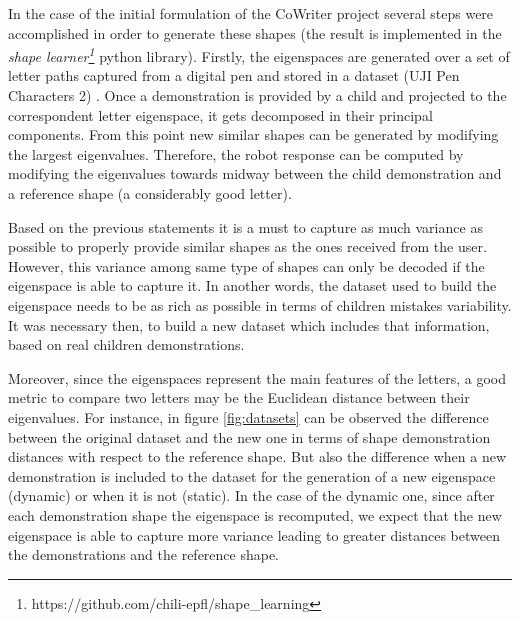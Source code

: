In the case of the initial formulation of the CoWriter project several steps were accomplished in order to generate these shapes (the result is implemented in the \textit{shape learner\footnote{https://github.com/chili-epfl/shape\_learning}} python library). Firstly, the eigenspaces are generated over a set of letter paths captured from a digital pen and stored in a dataset (UJI Pen Characters 2) \cite{ujidataset}. Once a demonstration is provided by a child and projected to the correspondent letter eigenspace, it gets decomposed in their principal components. From this point new similar shapes can be generated by modifying the largest eigenvalues. Therefore, the robot response can be computed by modifying the eigenvalues towards midway between the child demonstration and a reference shape (a considerably good letter).

Based on the previous statements it is a must to capture as much variance as possible to properly provide similar shapes as the ones received from the user. However, this variance among same type of shapes can only be decoded if the eigenspace is able to capture it. In another words, the dataset used to build the eigenspace needs to be as rich as possible in terms of children mistakes variability. It was necessary then, to build a new dataset which includes that information, based on real children demonstrations.

Moreover, since the eigenspaces represent the main features of the letters, a good metric to compare two letters may be the Euclidean distance between their eigenvalues. For instance, in figure \ref{fig:datasets} can be observed the difference between the original dataset and the new one in terms of shape demonstration distances with respect to the reference shape. But also the difference when a new demonstration is included to the dataset for the generation of a new eigenspace (dynamic) or when it is not (static). In the case of the dynamic one, since after each demonstration shape the eigenspace is recomputed, we expect that the new eigenspace is able to capture more variance leading to greater distances between the demonstrations and the reference shape.


